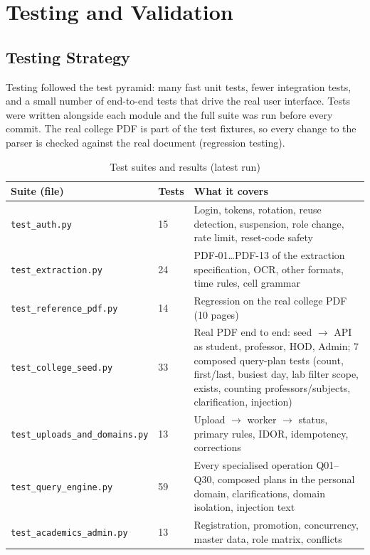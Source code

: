 \section{Testing and Validation}

\subsection{Testing Strategy}
Testing followed the test pyramid: many fast unit tests, fewer integration tests, and a small number
of end-to-end tests that drive the real user interface. Tests were written alongside each module and
the full suite was run before every commit. The real college PDF is part of the test fixtures, so
every change to the parser is checked against the real document (regression testing).

\begin{table}[H]
\centering
\caption{Test suites and results (latest run)}
\label{tab:suites}
\small
\begin{tabularx}{\textwidth}{@{}p{4.5cm}p{1.8cm}X@{}}
\toprule
\textbf{Suite (file)} & \textbf{Tests} & \textbf{What it covers}\\
\midrule
\texttt{test\_\allowbreak{}auth.py} & 15 & Login, tokens, rotation, reuse detection, suspension, role change, rate limit, reset-code safety\\
\texttt{test\_\allowbreak{}extraction.py} & 24 & PDF-01\ldots PDF-13 of the extraction specification, OCR, other formats, time rules, cell grammar\\
\texttt{test\_\allowbreak{}reference\_\allowbreak{}pdf.py} & 14 & Regression on the real college PDF (10 pages)\\
\texttt{test\_\allowbreak{}college\_\allowbreak{}seed.py} & 33 & Real PDF end to end: seed $\rightarrow$ API as student, professor, HOD, Admin; 7 composed query-plan tests (count, first/last, busiest day, lab filter scope, exists, counting professors/subjects, clarification, injection)\\
\texttt{test\_\allowbreak{}uploads\_\allowbreak{}and\_\allowbreak{}domains.py} & 13 & Upload $\rightarrow$ worker $\rightarrow$ status, primary rules, IDOR, idempotency, corrections\\
\texttt{test\_\allowbreak{}query\_\allowbreak{}engine.py} & 59 & Every specialised operation Q01--Q30, composed plans in the personal domain, clarifications, domain isolation, injection text\\
\texttt{test\_\allowbreak{}academics\_\allowbreak{}admin.py} & 13 & Registration, promotion, concurrency, master data, role matrix, conflicts\\

\end{tabularx}
\end{table}
